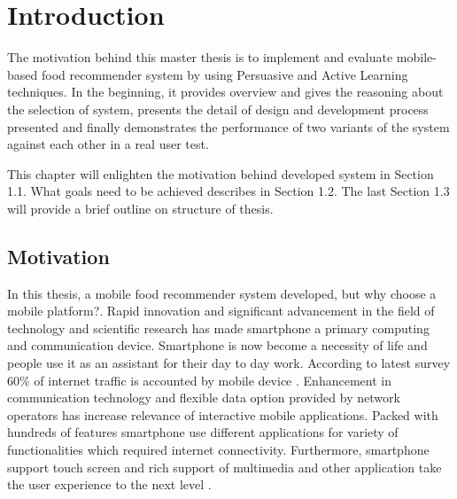 \chapter{Introduction}
\setcounter{page}{1}%
\thispagestyle{empty}

The motivation behind this master thesis is to implement and evaluate mobile-based food recommender system by using Persuasive and Active Learning techniques. In the beginning, it provides overview and gives the reasoning about the selection of system, presents the detail of design and development process presented and finally demonstrates the performance of two variants of the system against each other in a real user test. \newline

This chapter will enlighten the motivation behind developed system in Section 1.1. What goals need to be achieved describes in Section 1.2. The last Section 1.3 will provide a brief outline on structure of thesis.

\section{Motivation}\label{motivation}

In this thesis, a mobile food recommender system developed, but why choose a mobile platform?. Rapid innovation and significant advancement in the field of technology and scientific research has made smartphone a primary computing and communication device. Smartphone is now become a necessity of life and people use it as an assistant for their day to day work. According to latest survey 60\% of internet traffic is accounted by mobile device \cite{shawnhessinger2014mobiletraffic}. Enhancement in communication technology and flexible data option provided by network operators has increase relevance of interactive mobile applications. Packed with hundreds of features smartphone use different applications for variety of functionalities which required internet connectivity. Furthermore, smartphone support touch screen and rich support of multimedia and other application take the user experience to the next level \cite{ricci2010mobile}.\newline

